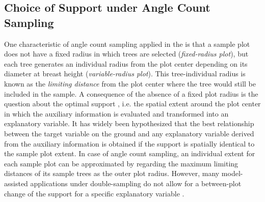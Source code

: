 \subsection{Choice of Support under Angle Count Sampling}
\label{sec:supp}

One characteristic of angle count sampling applied in the \bwi{} is that a sample plot does not have a fixed radius in which trees are selected (\textit{fixed-radius plot}), but each tree generates an individual radius from the plot center depending on its diameter at breast height (\textit{variable-radius plot}). This tree-individual radius is known as the \textit{limiting distance} from the plot center where the tree would still be included in the sample. A consequence of the absence of a fixed plot radius is the question about the optimal support \citep{hollaus2007}, i.e. the spatial extent around the plot center in which the auxiliary information is evaluated and transformed into an explanatory variable. It has widely been hypothesized that the best relationship between the target variable on the ground and any explanatory variable derived from the auxiliary information is obtained if the support is spatially identical to the sample plot extent. In case of angle count sampling, an individual extent for each sample plot can be approximated by regarding the maximum limiting distances of its sample trees as the outer plot radius. However, many model-assisted applications under double-sampling do not allow for a between-plot change of the support for a specific explanatory variable \citep{mandallaz2013c, mandallaz2013a}.\par
